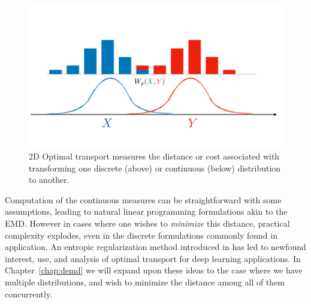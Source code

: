 \begin{figure}
	\centering
	\includegraphics[width=\textwidth,trim={0 5cm 0 10cm},clip]{2_bknd/ot.pdf}
	\caption[Distributions and Optimal Transport]{2D Optimal transport measures the distance or cost associated with transforming one discrete (above) or continuous (below) distribution to another.}
	\label{fig:bkndot}
\end{figure}
Computation of the continuous measures can be straightforward with some assumptions,
leading to natural linear programming formulations akin to the EMD.
However in cases where one wishes to \textit{minimize} this distance,
practical complexity explodes, even in the discrete
formulations commonly found in application.
An entropic regularization method introduced in \cite{cuturi2013sinkhorn}
has led to newfound interest,
use, and analysis of optimal transport for deep learning applications.
In Chapter~\ref{chap:demd} we will expand upon these
ideas to the case where we have multiple distributions,
and wish to minimize the distance among all of them concurrently.
